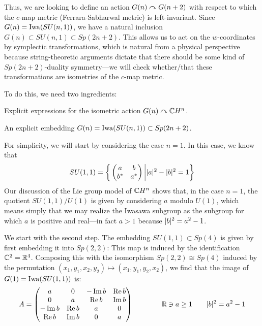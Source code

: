 \documentclass[parskip=half]{scrartcl}
\begin{document}
Thus, we are looking to define an action $G(n)\curvearrowright G(n+2)$ with respect to which the $c$-map metric (Ferrara-Sabharwal metric) is left-invariant. Since $G(n)=\operatorname{Iwa}(SU(n,1))$, we have a natural inclusion $G(n)\subset SU(n,1)\subset Sp(2n+2)$. This allows us to act on the $w$-coordinates by symplectic transformations, which is natural from a physical perspective because string-theoretic arguments dictate that there should be some kind of $Sp(2n+2)$-duality symmetry---we will check whether/that these transformations are isometries of the $c$-map metric.

To do this, we need two ingredients: 
\begin{numberedlist}
	\item Explicit expressions for the isometric action $G(n)\curvearrowright \mathbb{C} H^n$.
	\item An explicit embedding $G(n)=\operatorname{Iwa}(SU(n,1))\subset Sp(2n+2)$.
\end{numberedlist}

For simplicity, we will start by considering the case $n=1$. In this case, we know that 
\begin{equation*}
	SU(1,1)=\bigg\{
	\begin{pmatrix}
		a & b \\ b^* & a^*
	\end{pmatrix}
	\bigg|
	\lvert a \rvert^2-\lvert b \rvert^2=1\bigg\}
\end{equation*}
Our discussion of the Lie group model of $\mathbb{C} H^n$ shows that, in the case $n=1$, the quotient $SU(1,1)/U(1)$ is given by considering $a$ modulo $U(1)$, which means simply that we may realize the Iwasawa subgroup as the subgroup for which $a$ is positive and real---in fact $a>1$ because $\lvert b \rvert^2=a^2-1$.

We start with the second step. The embedding $SU(1,1)\subset Sp(4)$ is given by first embedding it into $Sp(2,2)$: This map is induced by the identification $\mathbb{C}^2=\mathbb{R}^4$. Composing this with the isomorphism $Sp(2,2)\cong Sp(4)$ induced by the permutation $(x_1,y_1,x_2,y_2)\mapsto (x_1,y_1,y_2,x_2)$, we find that the image of $G(1)=\operatorname{Iwa}(SU(1,1))$ is:
\begin{equation*}
	A=
	\begin{pmatrix}
		a & 0 & -\operatorname{Im} b & \operatorname{Re} b\\
		0 & a & \operatorname{Re} b & \operatorname{Im} b \\
		-\operatorname{Im} b & \operatorname{Re} b & a & 0 \\
		\operatorname{Re} b & \operatorname{Im} b & 0 & a
	\end{pmatrix}
	\qquad \qquad 
	\mathbb{R}\ni a\geq 1 \qquad \lvert b \rvert^2=a^2-1
\end{equation*} 
\end{document}
